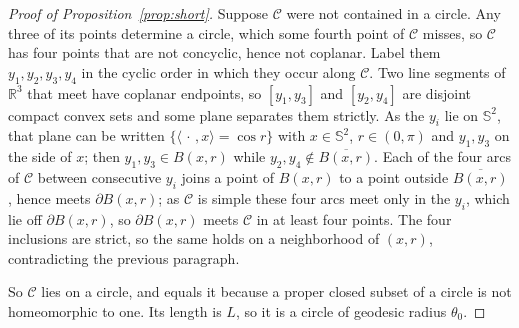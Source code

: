 \documentclass[10pt,a4paper]{amsart}
\newcommand{\R}{\mathbb{R}}
\newcommand{\Sph}{\mathbb{S}^{2}}
\begin{document}
\begin{proof}[Proof of Proposition~\ref{prop:short}]
Suppose $\mathcal{C}$ were not contained in a circle. Any three of its points
determine a circle, which some fourth point of $\mathcal{C}$ misses, so
$\mathcal{C}$ has four points that are not concyclic, hence not coplanar.
Label them $y_{1},y_{2},y_{3},y_{4}$ in the cyclic order in which they occur
along $\mathcal{C}$. Two line segments of $\R^{3}$ that meet have coplanar
endpoints, so $[y_{1},y_{3}]$ and $[y_{2},y_{4}]$ are disjoint compact convex
sets and some plane separates them strictly. As the $y_{i}$ lie on $\Sph$, that
plane can be written $\{\langle\,\cdot\,,x\rangle=\cos r\}$ with $x\in\Sph$,
$r\in(0,\pi)$ and $y_{1},y_{3}$ on the side of $x$; then
$y_{1},y_{3}\in B(x,r)$ while $y_{2},y_{4}\notin\overline{B(x,r)}$. Each of the
four arcs of $\mathcal{C}$ between consecutive $y_{i}$ joins a point of
$B(x,r)$ to a point outside $\overline{B(x,r)}$, hence meets
$\partial B(x,r)$; as $\mathcal{C}$ is simple these four arcs meet only in the
$y_{i}$, which lie off $\partial B(x,r)$, so $\partial B(x,r)$ meets
$\mathcal{C}$ in at least four points. The four inclusions are strict, so the
same holds on a neighborhood of $(x,r)$, contradicting the previous paragraph.

So $\mathcal{C}$ lies on a circle, and equals it because a proper closed subset
of a circle is not homeomorphic to one. Its length is $L$, so it is a circle of
geodesic radius $\theta_{0}$.
\end{proof}
\end{document}
